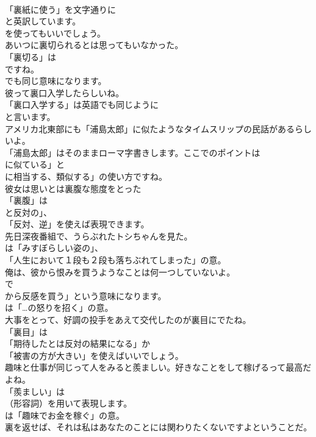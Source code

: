 \documentclass[8pt]{extreport}
\begin{document}
\begin{CJK}{UTF8}{min}
\\	「裏紙に使う」を文字通りに
\\	と英訳しています。
\\	を使ってもいいでしょう。	
\\	あいつに裏切られるとは思ってもいなかった。 
\\	「裏切る」は
\\	ですね。
\\	でも同じ意味になります。	
\\	彼って裏口入学したらしいね。 
\\	「裏口入学する」は英語でも同じように
\\	と言います。	
\\	アメリカ北東部にも「浦島太郎」に似たようなタイムスリップの民話があるらしいよ。 
\\	「浦島太郎」はそのままローマ字書きします。ここでのポイントは
\\	に似ている」と
\\	に相当する、類似する」の使い方ですね。	
\\	彼女は思いとは裏腹な態度をとった 
\\	「裏腹」は
\\	と反対の」、
\\	「反対、逆」を使えば表現できます。	
\\	先日深夜番組で、うらぶれたトシちゃんを見た。 
\\	は「みすぼらしい姿の」、
\\	「人生において１段も２段も落ちぶれてしまった」の意。	
\\	俺は、彼から恨みを買うようなことは何一つしていないよ。 
\\	で
\\	から反感を買う」という意味になります。
\\	は「…の怒りを招く」の意。	
\\	大事をとって、好調の投手をあえて交代したのが裏目にでたね。 
\\	「裏目」は
\\	「期待したとは反対の結果になる」か
\\	「被害の方が大きい」を使えばいいでしょう。	
\\	趣味と仕事が同じって人をみると羨ましい。好きなことをして稼げるって最高だよね。 
\\	「羨ましい」は
\\	（形容詞）を用いて表現します。
\\	は「趣味でお金を稼ぐ」の意。	
\\	裏を返せば、それは私はあなたのことには関わりたくないですよということだ。 

\end{CJK}
\end{document}
